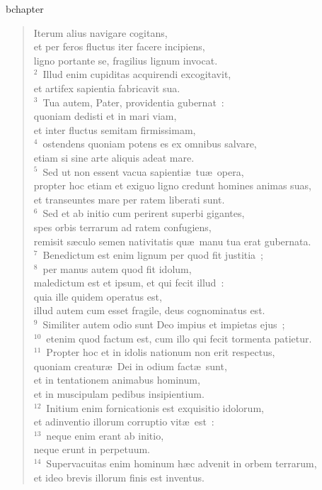 bchapter\begin{verse}\vspace{-19pt}Iterum alius navigare cogitans,\\ et per feros fluctus iter facere incipiens,\\ ligno portante se, fragilius lignum invocat.\\
${}^{2}$~Illud enim cupiditas acquirendi excogitavit,\\ et artifex sapientia fabricavit sua.\\
${}^{3}$~Tua autem, Pater, providentia gubernat~:\\ quoniam dedisti et in mari viam,\\ et inter fluctus semitam firmissimam,\\
${}^{4}$~ostendens quoniam potens es ex omnibus salvare,\\ etiam si sine arte aliquis adeat mare.\\
${}^{5}$~Sed ut non essent vacua sapienti\ae\ tu\ae\ opera,\\ propter hoc etiam et exiguo ligno credunt homines animas suas,\\ et transeuntes mare per ratem liberati sunt.\\
${}^{6}$~Sed et ab initio cum perirent superbi gigantes,\\ spes orbis terrarum ad ratem confugiens,\\ remisit s\ae culo semen nativitatis qu\ae\ manu tua erat gubernata.\\
${}^{7}$~Benedictum est enim lignum per quod fit justitia~;\\
${}^{8}$~per manus autem quod fit idolum,\\ maledictum est et ipsum, et qui fecit illud~:\\ quia ille quidem operatus est,\\ illud autem cum esset fragile, deus cognominatus est.\\
${}^{9}$~Similiter autem odio sunt Deo impius et impietas ejus~;\\
${}^{10}$~etenim quod factum est, cum illo qui fecit tormenta patietur.\\
${}^{11}$~Propter hoc et in idolis nationum non erit respectus,\\ quoniam creatur\ae\ Dei in odium fact\ae\ sunt,\\ et in tentationem animabus hominum,\\ et in muscipulam pedibus insipientium.\\
${}^{12}$~Initium enim fornicationis est exquisitio idolorum,\\ et adinventio illorum corruptio vit\ae\ est~:\\
${}^{13}$~neque enim erant ab initio,\\ neque erunt in perpetuum.\\
${}^{14}$~Supervacuitas enim hominum h\ae c advenit in orbem terrarum,\\ et ideo brevis illorum finis est inventus.\end{verse}



